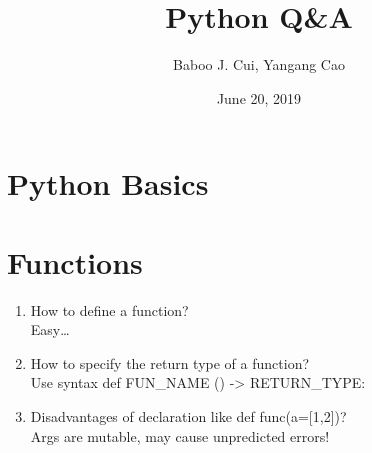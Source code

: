 \documentclass[10pt,a4paper,oneside]{article}
\date{June 20, 2019}
\author{Baboo J. Cui, Yangang Cao}
\title{Python Q\&A}
\begin{document}
\maketitle
\tableofcontents

\newpage

\section{Python Basics}

\section{Functions}
\begin{enumerate}[1.]
\item How to define a function?\\
Easy\dots
\item How to specify the return type of a function?\\
Use syntax def FUN\_NAME () -> RETURN\_TYPE:
\item Disadvantages of declaration like def func(a=[1,2])?\\
Args are mutable, may cause unpredicted errors!
\end{enumerate}
\end{document}
